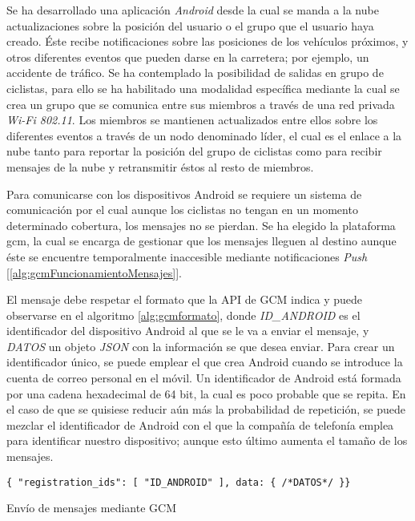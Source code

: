 Se ha desarrollado una aplicación \emph{Android} desde la cual se manda a la nube
actualizaciones sobre la posición del usuario o el grupo que el usuario haya creado.
Éste recibe notificaciones sobre las posiciones de los vehículos próximos, y otros
diferentes eventos que pueden darse en la carretera; por ejemplo, un accidente de
tráfico. Se ha contemplado la posibilidad de salidas en grupo de ciclistas, para ello
se ha habilitado una modalidad específica mediante la cual se crea un grupo que se
comunica entre sus miembros a través de una red privada \emph{Wi-Fi 802.11}. Los
miembros se mantienen actualizados entre ellos sobre los diferentes eventos a través
de un nodo denominado líder, el cual es el enlace a la nube tanto para reportar la
posición del grupo de ciclistas como para recibir mensajes de la nube y retransmitir
éstos al resto de miembros.

Para comunicarse con los dispositivos Android se requiere un sistema de comunicación
por el cual aunque los ciclistas no tengan en un momento determinado cobertura, los
mensajes no se pierdan. Se ha elegido la plataforma \gls{gcm}, la cual se encarga de
gestionar que los mensajes lleguen al destino aunque éste se encuentre temporalmente
inaccesible mediante notificaciones \emph{Push} [\ref{alg:gcmFuncionamientoMensajes}].

El mensaje debe respetar el formato que la API de GCM indica y puede observarse en
el algoritmo \ref{alg:gcmformato}, donde \emph{ID\_ANDROID} es el identificador del
dispositivo Android al que se le va a enviar el mensaje, y \emph{DATOS} un objeto
\emph{JSON} con la información se que desea enviar. Para crear un identificador único,
se puede emplear el que crea Android cuando se introduce la cuenta de correo personal
en el móvil. Un identificador de Android está formada por una cadena hexadecimal de
64 bit, la cual es poco probable que se repita. En el caso de que se quisiese reducir
aún más la probabilidad de repetición, se puede mezclar el identificador de Android
con el que la compañía de telefonía emplea para identificar nuestro dispositivo; aunque
esto último aumenta el tamaño de los mensajes.

\begin{listing}
	\begin{minipage}{.4\textwidth}
		\begin{verbatim}
{ "registration_ids": [ "ID_ANDROID" ], data: { /*DATOS*/ }}
		\end{verbatim}
	\end{minipage}
	\caption{Envío de mensajes mediante GCM}\label{alg:gcmformato}
\end{listing}

